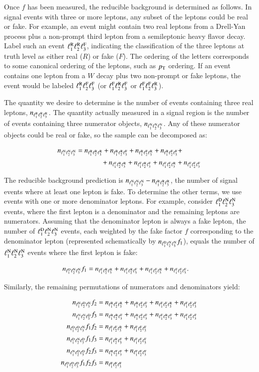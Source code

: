 Once $f$ has been measured, the reducible background is determined as follows. In signal events with three or more leptons, any subset of the leptons could be real or fake. For example, an event might contain two real leptons from a Drell-Yan process plus a non-prompt third lepton from a semileptonic heavy flavor decay. Label such an event $\RRF$, indicating the classification of the three leptons at truth level as either real ($R$) or fake ($F$). The ordering of the letters corresponds to some canonical ordering of the leptons, such as $\pt$ ordering. If an event contains one lepton from a $W$ decay plus two non-prompt or fake leptons, the event would be labeled $\RFF$ (or $\FRF$ or $\FFR$). 

The quantity we desire to determine is the number of events containing three real leptons, $n_{\RRR}$. The quantity actually measured in a signal region is the number of events containing three numerator objects, $n_{\NNN}$. Any of these numerator objects could be real or fake, so the sample can be decomposed as:

\begin{align}
	n_{\NNN} & = n_{\RRR} + n_{\RRF} + n_{\RFR} + n_{\RFF} +\\
	&  \hspace{0.5in} + n_{\FRR} + n_{\FRF} + n_{\FFR} + n_{\FFF}
\end{align}

The reducible background prediction is $n_{\NNN}-n_{\RRR}$, the number of signal events where at least one lepton is fake. To determine the other terms, we use events with one or more denominator leptons. For example, consider $\DNN$ events, where the first lepton is a denominator and the remaining leptons are numerators. Assuming that the denominator lepton is always a fake lepton, the number of $\DNN$ events, each weighted by the fake factor $f$ corresponding to the denominator lepton (represented schematically by $n_{\DNN}f_{1}$), equals the number of $\NNN$ events where the first lepton is fake:

\begin{align}
	n_{\DNN} f_{1} &= n_{\FRR} + n_{\FRF} + n_{\FFR} + n_{\FFF}.
\end{align}

Similarly, the remaining permutations of numerators and denominators yield:

\begin{align}
	n_{\NDN} f_{2} &= n_{\RFR} + n_{\RFF} + n_{\FFR} + n_{\FFF} \\
	n_{\NND} f_{3} &= n_{\RRF} + n_{\RFF} + n_{\FRF} + n_{\FFF} \\
	n_{\DDN} f_{1}f_{2} &= n_{\FFR} + n_{\FFF} \\
	n_{\DND} f_{1}f_{3} &= n_{\FRF} + n_{\FFF} \\
	n_{\NDD} f_{2}f_{3} &= n_{\RFF} + n_{\FFF} \\
	n_{\DDD} f_{1}f_{2}f_{3} &= n_{\FFF}
\end{align}

